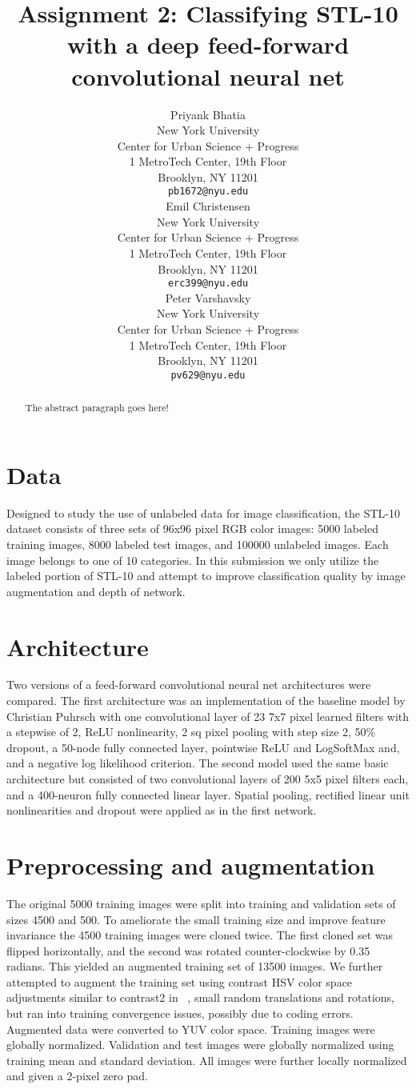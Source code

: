 \documentclass{article} %
\title{Assignment 2: Classifying STL-10 with a deep feed-forward convolutional neural net}
\author{
Priyank Bhatia \\
New York University \\
Center for Urban Science + Progress \\
1 MetroTech Center, 19th Floor \\
Brooklyn, NY 11201 \\
\texttt{pb1672@nyu.edu} \\
\AND
Emil Christensen \\
New York University \\
Center for Urban Science + Progress \\
1 MetroTech Center, 19th Floor \\
Brooklyn, NY 11201 \\
\texttt{erc399@nyu.edu} \\
\And
Peter Varshavsky \\
New York University \\
Center for Urban Science + Progress \\
1 MetroTech Center, 19th Floor \\
Brooklyn, NY 11201 \\
\texttt{pv629@nyu.edu} \\
}
\begin{document}
\maketitle


\begin{abstract}
The abstract paragraph goes here!
\end{abstract}

\section{Data}
\label{data}
Designed to study the use of unlabeled data for image classification, the STL-10 dataset \cite{coates2011analysis} consists of three sets of 96x96 pixel RGB color images: 5000 labeled training images, 8000 labeled test images, and 100000 unlabeled images. Each image belongs to one of 10 categories. In this submission we only utilize the labeled portion of STL-10 and attempt to improve classification quality by image augmentation and depth of network.

\section{Architecture}
\label{arc}
Two versions of a feed-forward convolutional neural net architectures were compared. The first architecture was an implementation of the baseline model by Christian Puhrsch with one convolutional layer of 23 7x7 pixel learned filters with a stepwise of 2, ReLU nonlinearity, 2 sq pixel pooling with step size 2, 50\% dropout, a 50-node fully connected layer, pointwise ReLU and LogSoftMax and, and a negative log likelihood criterion.
The second model used the same basic architecture but consisted of two convolutional layers of 200 5x5 pixel filters each, and a 400-neuron fully connected linear layer. Spatial pooling, rectified linear unit nonlinearities and dropout were applied as in the first network.

\section{Preprocessing and augmentation}
\label{preproc}
The original 5000 training images were split into training and validation sets of sizes 4500 and 500. To ameliorate the small training size and improve feature invariance the 4500 training images were cloned twice. The first cloned set was flipped horizontally, and the second was rotated counter-clockwise by 0.35 radians. This yielded an augmented training set of 13500 images. We further attempted to augment the training set using contrast HSV color space adjustments similar to contrast2 in ~\cite{DosovitskiySRB14}, small random translations and rotations, but ran into training convergence issues, possibly due to coding errors. Augmented data were converted to YUV color space. Training images were globally normalized. Validation and test images were globally normalized using training mean and standard deviation. All images were further locally normalized and given a 2-pixel zero pad.
\end{document}
